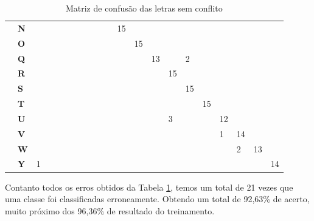 \begin{table}[H]
{\begin{tabular}{cl|l|l|l|l|l|l|l|l|l|l|l|l|l|l|l|l|l|l|l|}
			\multicolumn{1}{|c|}{} & \textbf{N} &  &  &  &  &  &  &  &  &  & 15 &  &  &  &  &  &  &  &  &  \\ \cline{2-21} 
			\multicolumn{1}{|c|}{} & \textbf{O} &  &  &  &  &  &  &  &  &  &  & 15 &  &  &  &  &  &  &  &  \\ \cline{2-21} 
			\multicolumn{1}{|c|}{} & \textbf{Q} &  &  &  &  &  &  &  &  &  &  &  & 13 &  & 2 &  &  &  &  &  \\ \cline{2-21} 
			\multicolumn{1}{|c|}{} & \textbf{R} &  &  &  &  &  &  &  &  &  &  &  &  & 15 &  &  &  &  &  &  \\ \cline{2-21} 
			\multicolumn{1}{|c|}{} & \textbf{S} &  &  &  &  &  &  &  &  &  &  &  &  &  & 15 &  &  &  &  &  \\ \cline{2-21} 
			\multicolumn{1}{|c|}{} & \textbf{T} &  &  &  &  &  &  &  &  &  &  &  &  &  &  & 15 &  &  &  &  \\ \cline{2-21} 
			\multicolumn{1}{|c|}{} & \textbf{U} &  &  &  &  &  &  &  &  &  &  &  &  & 3 &  &  & 12 &  &  &  \\ \cline{2-21} 
			\multicolumn{1}{|c|}{} & \textbf{V} &  &  &  &  &  &  &  &  &  &  &  &  &  &  &  & 1 & 14 &  &  \\ \cline{2-21} 
			\multicolumn{1}{|c|}{} & \textbf{W} &  &  &  &  &  &  &  &  &  &  &  &  &  &  &  &  & 2 & 13 &  \\ \cline{2-21} 
			\multicolumn{1}{|c|}{} & \textbf{Y} & 1 &  &  &  &  &  &  &  &  &  &  &  &  &  &  &  &  &  & 14 \\ \hline
		\end{tabular}%
	}
	\caption{Matriz de confusão das letras sem conflito}
	\label{tab:confusaosemconf}
\end{table}

Contanto todos os erros obtidos da Tabela \ref{tab:confusaosemconf}, temos um total de 21 vezes que uma classe foi classificadas erroneamente. Obtendo um total de 92,63\% de acerto, muito próximo dos 96,36\% de resultado do treinamento.


